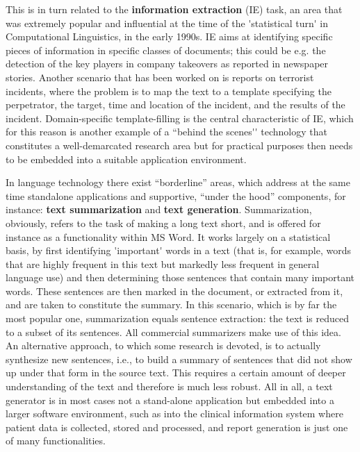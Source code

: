 \begin{multicols}{2}
This is in turn related to the {\bf information extraction} (IE) task, an
area that was extremely popular and influential at the time of the
{\mbox '}statistical turn{\mbox '} in Computational Linguistics, in the early
1990s. IE aims at identifying specific pieces of information in
specific classes of documents; this could be e.g. the detection of the
key players in company takeovers as reported in newspaper
stories. Another scenario that has been worked on is reports on
terrorist incidents, where the problem is to map the text to a
template specifying the perpetrator, the target, time and location of
the incident, and the results of the incident. Domain-specific
template-filling is the central characteristic of IE, which for this
reason is another example of a ``behind the scenes{\mbox '}{\mbox '} technology that
constitutes a well-demarcated research area but for practical purposes
then needs to be embedded into a suitable application environment.

In language technology there exist ``borderline'' areas, which address at the same time standalone applications and supportive, ``under the hood''
components, for instance: {\bf text summarization} and {\bf text
  generation}. Summarization, obviously, refers to the task of making
a long text short, and is offered for instance as a functionality
within MS Word. It works largely on a statistical basis, by first
identifying {\mbox '}important{\mbox '} words in a text (that is, for example, words
that are highly frequent in this text but markedly less frequent in
general language use) and then determining those sentences that
contain many important words. These sentences are then marked in the
document, or extracted from it, and are taken to constitute the
summary. In this scenario, which is by far the most popular one,
summarization equals sentence extraction: the text is reduced to a
subset of its sentences. All commercial summarizers make use of this
idea. An alternative approach, to which some research is devoted, is
to actually synthesize new sentences, i.e., to build a summary of
sentences that did not show up under that form in the source text. This
requires a certain amount of deeper understanding of the text and
therefore is much less robust. All in all, a text generator is in most
cases not a stand-alone application but embedded into a larger
software environment, such as into the clinical information system
where patient data is collected, stored and processed, and report
generation is just one of many functionalities.


\end{multicols}
